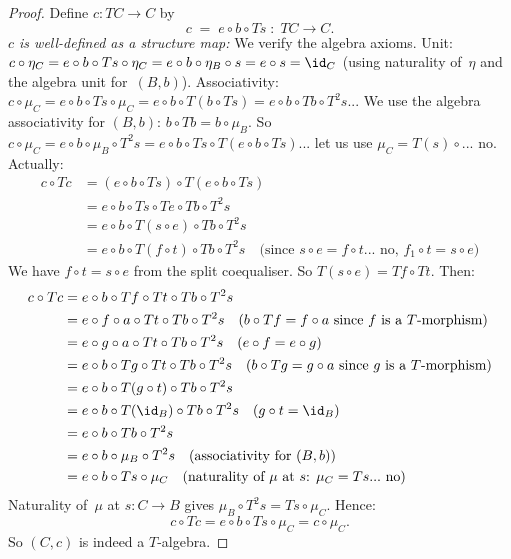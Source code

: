 \begin{proof}
Define $c\colon TC\to C$ by
\[
    c \;=\; e\circ b\circ Ts \;\colon\; TC\to C.
\]
\emph{$c$ is well-defined as a structure map:}
We verify the algebra axioms.  Unit: $c\circ\eta_C = e\circ b\circ Ts\circ\eta_C
= e\circ b\circ\eta_B\circ s = e\circ s = \id_C$
(using naturality of~$\eta$ and the algebra unit for~$(B,b)$).
Associativity: $c\circ\mu_C = e\circ b\circ Ts\circ\mu_C
= e\circ b\circ T(b\circ Ts) = e\circ b\circ Tb\circ T^2s$...
We use the algebra associativity for $(B,b)$: $b\circ Tb = b\circ\mu_B$.
So $c\circ\mu_C = e\circ b\circ\mu_B\circ T^2s = e\circ b\circ Ts\circ T(e\circ b\circ Ts)$...
let us use $\mu_C = T(s)\circ... $ no. Actually:
\begin{align*}
    c\circ Tc &= (e\circ b\circ Ts)\circ T(e\circ b\circ Ts) \\
    &= e\circ b\circ Ts\circ Te\circ Tb\circ T^2s \\
    &= e\circ b\circ T(s\circ e)\circ Tb\circ T^2s \\
    &= e\circ b\circ T(f\circ t)\circ Tb\circ T^2s
    \quad\text{(since $s\circ e = f\circ t$... no, $f_1\circ t = s\circ e$)}
\end{align*}
We have $f\circ t = s\circ e$ from the split coequaliser.
So $T(s\circ e) = Tf\circ Tt$.  Then:
\begin{align*}
    c\circ Tc &= e\circ b\circ Tf\circ Tt\circ Tb\circ T^2s \\
    &= e\circ f\circ a\circ Tt\circ Tb\circ T^2s
    \quad\text{($b\circ Tf = f\circ a$ since $f$ is a $T$-morphism)}\\
    &= e\circ g\circ a\circ Tt\circ Tb\circ T^2s
    \quad\text{($e\circ f = e\circ g$)}\\
    &= e\circ b\circ Tg\circ Tt\circ Tb\circ T^2s
    \quad\text{($b\circ Tg = g\circ a$ since $g$ is a $T$-morphism)}\\
    &= e\circ b\circ T(g\circ t)\circ Tb\circ T^2s \\
    &= e\circ b\circ T(\id_B)\circ Tb\circ T^2s
    \quad\text{($g\circ t = \id_B$)} \\
    &= e\circ b\circ Tb\circ T^2s \\
    &= e\circ b\circ\mu_B\circ T^2s
    \quad\text{(associativity for $(B,b)$)} \\
    &= e\circ b\circ Ts\circ\mu_C
    \quad\text{(naturality of $\mu$ at $s$: $\mu_C = Ts... $ no)}
\end{align*}
Naturality of~$\mu$ at $s\colon C\to B$ gives
$\mu_B\circ T^2s = Ts\circ\mu_C$.  Hence:
\[
    c\circ Tc = e\circ b\circ Ts\circ\mu_C = c\circ\mu_C.
\]
So $(C,c)$ is indeed a $T$-algebra.


\end{proof}
